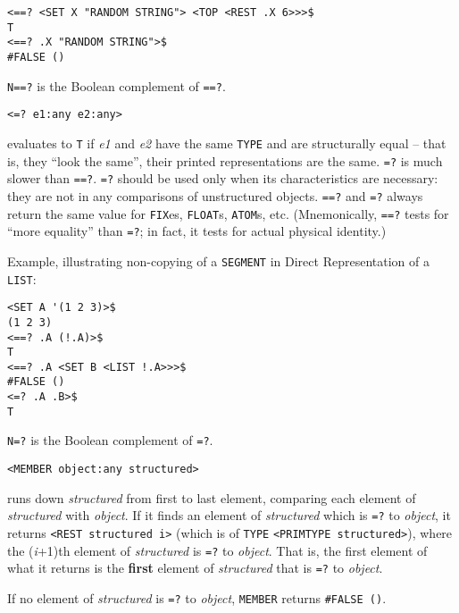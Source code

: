 \documentclass[a4paper]{scrbook}
\begin{document}
\begin{verbatim}
<==? <SET X "RANDOM STRING"> <TOP <REST .X 6>>>$
T
<==? .X "RANDOM STRING">$
#FALSE ()
\end{verbatim}

\texttt{N==?} is the Boolean complement of \texttt{==?}.

\begin{verbatim}
<=? e1:any e2:any>
\end{verbatim}

 evaluates to \texttt{T} if \emph{e1} and \emph{e2} have the same \texttt{TYPE} and are
structurally equal -- that is, they ``look the same'', their printed representations are the same. \texttt{=?} is much
slower than \texttt{==?}. \texttt{=?} should be used only when its characteristics are necessary: they are not in any
comparisons of unstructured objects. \texttt{==?} and \texttt{=?} always return the same value for \texttt{FIX}es,
\texttt{FLOAT}s, \texttt{ATOM}s, etc. (Mnemonically, \texttt{==?} tests for ``more equality'' than \texttt{=?}; in fact, it
tests for actual physical identity.)

Example, illustrating non-copying of a \texttt{SEGMENT} in Direct Representation of a
\texttt{LIST}:

\begin{verbatim}
<SET A '(1 2 3)>$
(1 2 3)
<==? .A (!.A)>$
T
<==? .A <SET B <LIST !.A>>>$
#FALSE ()
<=? .A .B>$
T
\end{verbatim}

\texttt{N=?} is the Boolean complement of \texttt{=?}.

\begin{verbatim}
<MEMBER object:any structured>
\end{verbatim}

 runs down \emph{structured} from first to last element, comparing each element of
\emph{structured} with \emph{object}. If it finds an element of \emph{structured} which is \texttt{=?} to \emph{object}, it
returns \texttt{\textless{}REST\ structured\ i\textgreater{}} (which is of \texttt{TYPE}
\texttt{\textless{}PRIMTYPE\ structured\textgreater{}}), where the (\emph{i}+1)th element of \emph{structured} is
\texttt{=?} to \emph{object}. That is, the first element of what it returns is the \textbf{first} element of
\emph{structured} that is \texttt{=?} to \emph{object}.

If no element of \emph{structured} is \texttt{=?} to \emph{object}, \texttt{MEMBER} returns \texttt{\#FALSE\ ()}.
\end{document}
